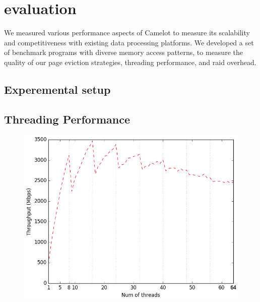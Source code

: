 \section{evaluation}
\label{sec:eval}

We measured various performance aspects of Camelot to measure its
scalability and competitiveness with existing data processing
platforms. We developed a set of benchmark programs with diverse
memory access patterns, to measure the quality of our page eviction
strategies, threading performance, and raid overhead.

\subsection{Experemental setup}

\subsection{Threading Performance}

\begin{figure}[H]
    \includegraphics[width=\columnwidth]{fig/throughputVsThreads}
    \caption{\todo{}}
    \label{fig:througputVsThreads}
\end{figure}

